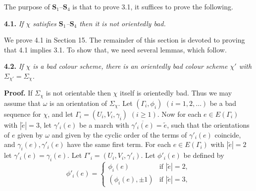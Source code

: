 The purpose of $\mathbf{S}_1$--$\mathbf{S}_4$ is that to prove 3.1, it suffices to prove the following.

\textbf{4.1.} \textit{If $\chi$ satisfies $\mathbf{S}_1$--$\mathbf{S}_4$ then it is not orientedly bad.}

We prove 4.1 in Section 15. The remainder of this section is devoted to proving that 4.1 implies 3.1. To show that, we need several lemmas, which follow.

\textbf{4.2.} \textit{If $\chi$ is a bad colour scheme, there is an orientedly bad colour scheme $\chi'$ with $\Sigma_{\chi'} = \Sigma_\chi$.}

\textbf{Proof.} If $\Sigma_\chi$ is not orientable then $\chi$ itself is orientedly bad. Thus we may assume that $\omega$ is an orientation of $\Sigma_\chi$. Let $(\Gamma_i, \phi_i)$ $(i = 1, 2, \dots)$ be a bad sequence for $\chi$, and let $\Gamma_i = (U_i, V_i, \gamma_i)$ $(i \ge 1)$. Now for each $e \in E(\Gamma_i)$ with $|\tilde{e}| = 3$, let $\gamma'_i(e)$ be a march with $\overline{\gamma'_i(e)} = \tilde{e}$, such that the orientations of $e$ given by $\omega$ and given by the cyclic order of the terms of $\gamma'_i(e)$ coincide, and $\gamma_i(e), \gamma'_i(e)$ have the same first term. For each $e \in E(\Gamma_i)$ with $|\tilde{e}| = 2$ let $\gamma'_i(e) = \gamma_i(e)$. Let $\Gamma'_i = (U_i, V_i, \gamma'_i)$. Let $\phi'_i(e)$ be defined by
\begin{equation*}
\phi'_i(e) = \begin{cases} \phi_i(e) & \text{if } |\tilde{e}| = 2, \\ (\phi_i(e), \pm 1) & \text{if } |\tilde{e}| = 3, \end{cases}
\end{equation*}
